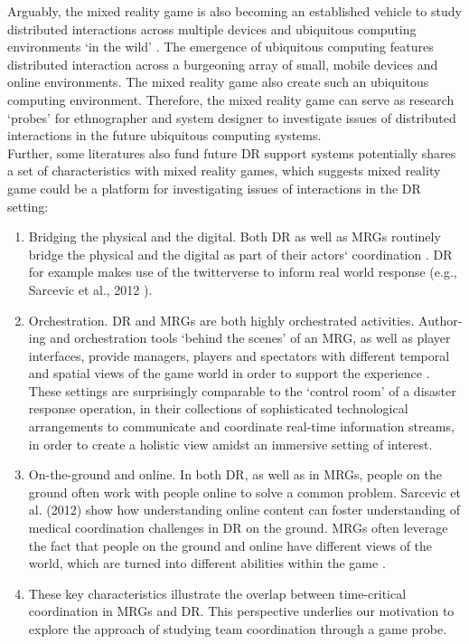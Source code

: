 Arguably, the mixed reality game is also becoming an established vehicle to study distributed interactions across multiple devices and ubiquitous computing environments `in the wild' \cite{Crabtree2006, Benford2005, Fischer2012}. The emergence of ubiquitous computing features distributed interaction across a burgeoning array of small, mobile devices and online environments. The mixed reality game also create such an ubiquitous computing environment. Therefore, the mixed reality game can serve as research `probes' for ethnographer and system designer to investigate issues of distributed interactions in the future ubiquitous computing systems.\\

Further, some literatures \cite{Fischer2012} also fund future DR support systems potentially shares a set of characteristics with mixed reality games, which suggests mixed reality game could be a platform for investigating issues of interactions in the DR setting:\\

\begin{enumerate}
\item Bridging the physical and the digital. Both DR as well as MRGs routinely bridge the physical and the digital as part of their actors` coordination \cite{Benford2005}. DR for example makes use of the twitterverse to inform real world response (e.g., Sarcevic et al., 2012 \cite{Sarcevic2012}).

\item Orchestration. DR and MRGs are both highly orchestrated activities. Author-ing and orchestration tools `behind the scenes' of an MRG, as well as player interfaces, provide managers, players and spectators with different temporal and spatial views of the game world in order to support the experience \cite{Crabtree2004}. These settings are surprisingly comparable to the `control room' of a disaster response operation, in their collections of sophisticated technological arrangements to communicate and coordinate real-time information streams, in order to create a holistic view amidst an immersive setting of interest.\\

\item On-the-ground and online. In both DR, as well as in MRGs, people on the ground often work with people online to solve a common problem. Sarcevic et al. (2012)\cite{Sarcevic2012} show how understanding online content can foster understanding of medical coordination challenges in DR on the ground. MRGs often leverage the fact that people on the ground and online have different views of the world, which are turned into different abilities within the game \cite{Flintham2003}.\\ 

\item These key characteristics illustrate the overlap between time-critical coordination in MRGs and DR. This perspective underlies our motivation to explore the approach of studying team coordination through a game probe.\\

\end{enumerate}

